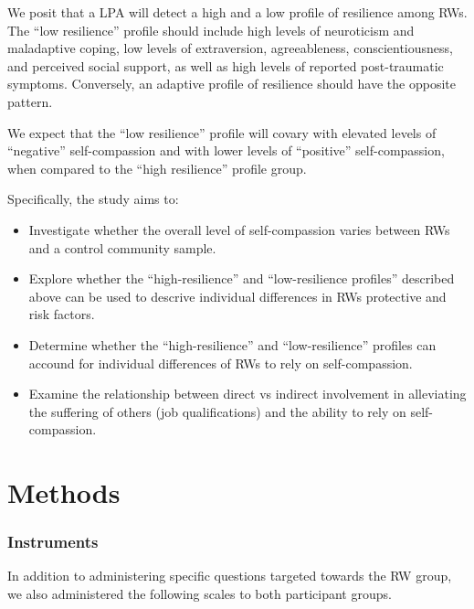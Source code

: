 \documentclass[
  man]{apa6}
\providecommand{\tightlist}{%
  \setlength{\itemsep}{0pt}\setlength{\parskip}{0pt}}
\begin{document}
We posit that a LPA will detect a high and a low profile of resilience among RWs. The ``low resilience'' profile should include high levels of neuroticism and maladaptive coping, low levels of extraversion, agreeableness, conscientiousness, and perceived social support, as well as high levels of reported post-traumatic symptoms. Conversely, an adaptive profile of resilience should have the opposite pattern.

We expect that the ``low resilience'' profile will covary with elevated levels of ``negative'' self-compassion and with lower levels of ``positive'' self-compassion, when compared to the ``high resilience'' profile group.

Specifically, the study aims to:

\begin{itemize}
\tightlist
\item
  Investigate whether the overall level of self-compassion varies between RWs and a control community sample.
\item
  Explore whether the ``high-resilience'' and ``low-resilience profiles'' described above can be used to descrive individual differences in RWs protective and risk factors.
\item
  Determine whether the ``high-resilience'' and ``low-resilience'' profiles can accound for individual differences of RWs to rely on self-compassion.
\item
  Examine the relationship between direct vs indirect involvement in alleviating the suffering of others (job qualifications) and the ability to rely on self-compassion.
\end{itemize}

\hypertarget{methods}{%
\section{Methods}\label{methods}}

\hypertarget{instruments}{%
\subsubsection{Instruments}\label{instruments}}

In addition to administering specific questions targeted towards the RW group, we also administered the following scales to both participant groups.
\end{document}
